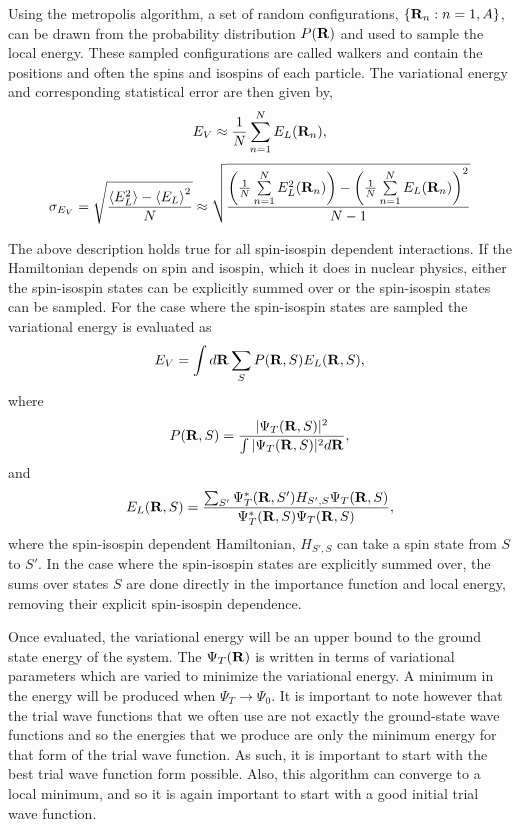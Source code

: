 Using the metropolis algorithm, a set of random configurations, $\{\mathbf{R}_n: n=1,A\}$, can be drawn from the probability distribution $P(\mathbf{R})$ and used to sample the local energy. These sampled configurations are called walkers and contain the positions and often the spins and isospins of each particle. The variational energy and corresponding statistical error are then given by,
\begin{equation} 
  E_V \approx \frac{1}{N} \sum\limits_{n=1}^N E_L({\mathbf{R}_n}),
\end{equation}
\begin{equation} 
  \sigma_{E_V} = \sqrt{\frac{\left<E_L^2\right>-\left<E_L\right>^2}{N}} \approx \sqrt{\frac{\left(\frac{1}{N}\sum\limits_{n=1}^NE_L^2(\mathbf{R}_n)\right) - \left(\frac{1}{N}\sum\limits_{n=1}^NE_L(\mathbf{R}_n)\right)^2}{N-1}}
\end{equation}

The above description holds true for all spin-isospin dependent interactions. If the Hamiltonian depends on spin and isospin, which it does in nuclear physics, either the spin-isospin states can be explicitly summed over or the spin-isospin states can be sampled. For the case where the spin-isospin states are sampled the variational energy is evaluated as
\begin{equation} 
  E_V = \int d\mathbf{R} \sum\limits_S P(\mathbf{R},S) E_L(\mathbf{R},S),
\end{equation}
where
\begin{equation}
   P(\mathbf{R},S) = \frac{|\Psi_T(\mathbf{R},S)|^2}{\int|\Psi_T(\mathbf{R},S)|^2d\mathbf{R}},
\end{equation}
and
\begin{equation}
   E_L(\mathbf{R},S) = \frac{\sum_{S'}\Psi_T^*(\mathbf{R},S')H_{S',S}\Psi_T(\mathbf{R},S)}{\Psi_T^*(\mathbf{R},S)\Psi_T(\mathbf{R},S)},
\end{equation}
where the spin-isospin dependent Hamiltonian, $H_{S',S}$ can take a spin state from $S$ to $S'$. In the case where the spin-isospin states are explicitly summed over, the sums over states $S$ are done directly in the importance function and local energy, removing their explicit spin-isospin dependence.

Once evaluated, the variational energy will be an upper bound to the ground state energy of the system. The $\Psi_T(\mathbf{R})$ is written in terms of variational parameters which are varied to minimize the variational energy. A minimum in the energy will be produced when $\Psi_T \rightarrow \Psi_0$. It is important to note however that the trial wave functions that we often use are not exactly the ground-state wave functions and so the energies that we produce are only the minimum energy for that form of the trial wave function. As such, it is important to start with the best trial wave function form possible. Also, this algorithm can converge to a local minimum, and so it is again important to start with a good initial trial wave function.

